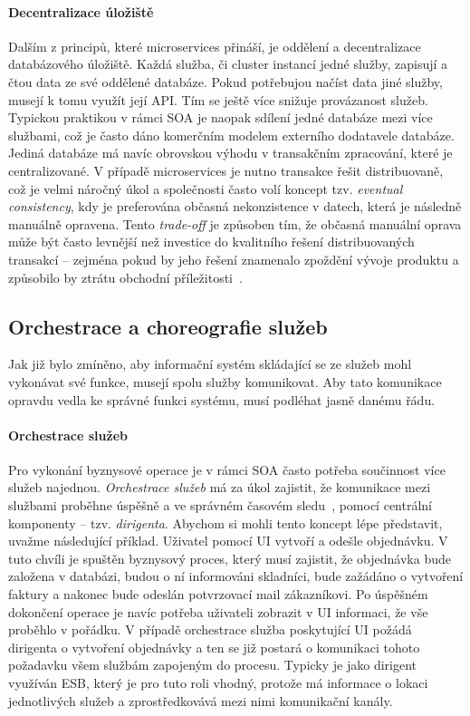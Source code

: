 \paragraph{Decentralizace úložiště}
Dalším z principů, které microservices přináší, je oddělení a decentralizace
databázového úložiště. Každá služba, či cluster instancí jedné služby, zapisují
a čtou data ze své oddělené databáze. Pokud potřebujou načíst data jiné služby,
musejí k tomu využít její API. Tím se ještě více snižuje provázanost služeb.
Typickou praktikou v rámci SOA je naopak sdílení jedné databáze mezi více službami,
což je často dáno komerčním modelem externího dodatavele databáze. Jediná databáze
má navíc obrovskou výhodu v transakčním zpracování, které je centralizované.
V případě microservices je nutno transakce řešit distribuovaně, což je velmi náročný
úkol a společnosti často volí koncept tzv. \textit{eventual consistency}, kdy je
preferována občasná nekonzistence v datech, která je následně manuálně opravena.
Tento \textit{trade-off} je způsoben tím, že občasná manuální oprava může být
často levnější než investice do kvalitního řešení distribuovaných transakcí –
zejména pokud by jeho řešení znamenalo zpoždění vývoje produktu a způsobilo
by ztrátu obchodní příležitosti~\cite{lewis2014microservices}.

\subsection{Orchestrace a choreografie služeb}

Jak již bylo zmíněno, aby informační systém skládající se ze služeb mohl vykonávat
své funkce, musejí spolu služby komunikovat. Aby tato komunikace opravdu vedla
ke správné funkci systému, musí podléhat jasně danému řádu.

\paragraph{Orchestrace služeb}
Pro vykonání byznysové operace je v rámci SOA často potřeba součinnost více služeb
najednou. \textit{Orchestrace služeb} má za úkol zajistit, že komunikace mezi službami
proběhne úspěšně a ve správném časovém sledu~\cite{orchestration},
pomocí centrální komponenty – tzv. \textit{dirigenta}.
Abychom si mohli tento koncept lépe představit, uvažme následující příklad. Uživatel
pomocí UI vytvoří a odešle objednávku. V tuto chvíli
je spuštěn byznysový proces, který musí zajistit, že objednávka bude založena v databázi,
budou o ní informováni skladníci, bude zažádáno o vytvoření faktury a nakonec bude odeslán
potvrzovací mail zákazníkovi. Po úspěšném dokončení operace je navíc potřeba uživateli
zobrazit v UI informaci, že vše proběhlo v pořádku. V případě orchestrace služba
poskytující UI požádá dirigenta o vytvoření objednávky a ten se již postará o
komunikaci tohoto požadavku všem službám zapojeným do procesu.
Typicky je jako dirigent využíván ESB, který je pro tuto roli vhodný,
protože má informace o lokaci jednotlivých služeb a zprostředkovává mezi nimi
komunikační kanály.

